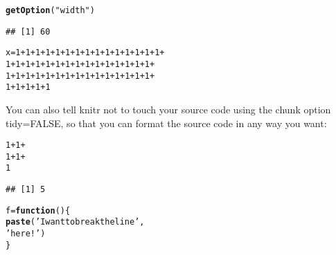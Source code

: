 \documentclass{article}\usepackage[]{graphicx}\usepackage[]{color}
\makeatletter
\newcommand{\hlnum}[1]{\textcolor[rgb]{0.686,0.059,0.569}{#1}}%
\newcommand{\hlstr}[1]{\textcolor[rgb]{0.192,0.494,0.8}{#1}}%
\newcommand{\hlopt}[1]{\textcolor[rgb]{0,0,0}{#1}}%
\newcommand{\hlstd}[1]{\textcolor[rgb]{0.345,0.345,0.345}{#1}}%
\newcommand{\hlkwa}[1]{\textcolor[rgb]{0.161,0.373,0.58}{\textbf{#1}}}%
\newcommand{\hlkwb}[1]{\textcolor[rgb]{0.69,0.353,0.396}{#1}}%
\newcommand{\hlkwd}[1]{\textcolor[rgb]{0.737,0.353,0.396}{\textbf{#1}}}%
\newenvironment{kframe}{%
 \def\at@end@of@kframe{}%
 \ifinner\ifhmode%
  \def\at@end@of@kframe{\end{minipage}}%
  \begin{minipage}{\columnwidth}%
 \fi\fi%
 \def\FrameCommand##1{\hskip\@totalleftmargin \hskip-\fboxsep
 \colorbox{shadecolor}{##1}\hskip-\fboxsep
     \hskip-\linewidth \hskip-\@totalleftmargin \hskip\columnwidth}%
 \MakeFramed {\advance\hsize-\width
   \@totalleftmargin\z@ \linewidth\hsize
   \@setminipage}}%
 {\par\unskip\endMakeFramed%
 \at@end@of@kframe}
\newenvironment{knitrout}{}{} %
\makeatother
\begin{document}
\begin{knitrout}
\color{fgcolor}\begin{kframe}
\begin{alltt}
\hlkwd{getOption}\hlstd{(}\hlstr{"width"}\hlstd{)}
\end{alltt}
\begin{verbatim}
## [1] 60
\end{verbatim}
\begin{alltt}
\hlstd{x} \hlkwb{=} \hlnum{1} \hlopt{+} \hlnum{1} \hlopt{+} \hlnum{1} \hlopt{+} \hlnum{1} \hlopt{+} \hlnum{1} \hlopt{+} \hlnum{1} \hlopt{+} \hlnum{1} \hlopt{+} \hlnum{1} \hlopt{+} \hlnum{1} \hlopt{+} \hlnum{1} \hlopt{+} \hlnum{1} \hlopt{+} \hlnum{1} \hlopt{+} \hlnum{1} \hlopt{+} \hlnum{1} \hlopt{+} \hlnum{1} \hlopt{+}
    \hlnum{1} \hlopt{+} \hlnum{1} \hlopt{+} \hlnum{1} \hlopt{+} \hlnum{1} \hlopt{+} \hlnum{1} \hlopt{+} \hlnum{1} \hlopt{+} \hlnum{1} \hlopt{+} \hlnum{1} \hlopt{+} \hlnum{1} \hlopt{+} \hlnum{1} \hlopt{+} \hlnum{1} \hlopt{+} \hlnum{1} \hlopt{+} \hlnum{1} \hlopt{+} \hlnum{1} \hlopt{+} \hlnum{1} \hlopt{+}
    \hlnum{1} \hlopt{+} \hlnum{1} \hlopt{+} \hlnum{1} \hlopt{+} \hlnum{1} \hlopt{+} \hlnum{1} \hlopt{+} \hlnum{1} \hlopt{+} \hlnum{1} \hlopt{+} \hlnum{1} \hlopt{+} \hlnum{1} \hlopt{+} \hlnum{1} \hlopt{+} \hlnum{1} \hlopt{+} \hlnum{1} \hlopt{+} \hlnum{1} \hlopt{+} \hlnum{1} \hlopt{+} \hlnum{1} \hlopt{+}
    \hlnum{1} \hlopt{+} \hlnum{1} \hlopt{+} \hlnum{1} \hlopt{+} \hlnum{1} \hlopt{+} \hlnum{1}
\end{alltt}
\end{kframe}
\end{knitrout}

You can also tell knitr not to touch your source code using the chunk option tidy=FALSE, so that you can format the source code in any way you want:

\begin{knitrout}
\color{fgcolor}\begin{kframe}
\begin{alltt}
\hlnum{1} \hlopt{+} \hlnum{1} \hlopt{+}
  \hlnum{1}\hlopt{+}\hlnum{1}\hlopt{+}
  \hlnum{1}
\end{alltt}
\begin{verbatim}
## [1] 5
\end{verbatim}
\begin{alltt}
\hlstd{f} \hlkwb{=} \hlkwa{function}\hlstd{() \{}
  \hlkwd{paste}\hlstd{(}\hlstr{'I want to break the line'}\hlstd{,}
        \hlstr{'here!'}\hlstd{)}
\hlstd{\}}
\end{alltt}
\end{kframe}
\end{knitrout}
\end{document}
